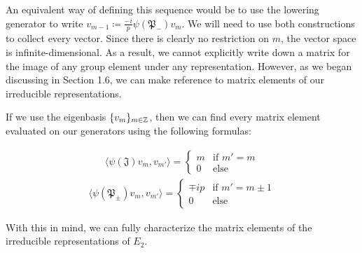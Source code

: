 An equivalent way of defining this sequence would be to use the lowering generator to write $v_{m-1} \coloneq \frac{-i}{p}\psi(\mathfrak{P}_-)v_m$. We will need to use both constructions to collect every vector. Since there is clearly no restriction on $m$, the vector space is infinite-dimensional. As a result, we cannot explicitly write down a matrix for the image of any group element under any representation. However, as we began discussing in Section 1.6, we can make reference to matrix elements of our irreducible representations. 

If we use the eigenbasis $\{v_m\}_{m\in\mathbb{Z}}$, then we can find every matrix element evaluated on our generators using the following formulas:

\begin{equation}
\begin{aligned}
	 \langle \psi(\mathfrak{J})v_m , v_{m'} \rangle = \begin{cases}
																m & \text{if }m' = m\\
																0 & \text{else}
															\end{cases}
\end{aligned}
\end{equation}
\begin{equation}
\begin{aligned}
	 \langle \psi(\mathfrak{P}_\pm)v_m , v_{m'} \rangle = \begin{cases}
																\mp ip & \text{if }m' = m \pm 1\\
																0 & \text{else}	
															\end{cases}
\end{aligned}
\end{equation}

With this in mind, we can fully characterize the matrix elements of the irreducible representations of $E_2$.

